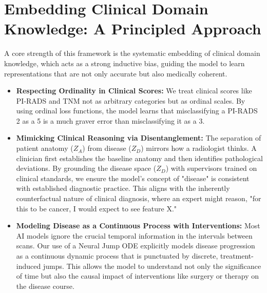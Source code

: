 \documentclass[11pt, a4paper]{article}
\begin{document}
\section{Embedding Clinical Domain Knowledge: A Principled Approach}
A core strength of this framework is the systematic embedding of clinical domain knowledge, which acts as a strong inductive bias, guiding the model to learn representations that are not only accurate but also medically coherent.
\begin{itemize}
    \item \textbf{Respecting Ordinality in Clinical Scores:} We treat clinical scores like PI-RADS and TNM not as arbitrary categories but as ordinal scales. By using ordinal loss functions, the model learns that misclassifying a PI-RADS 2 as a 5 is a much graver error than misclassifying it as a 3.
    \item \textbf{Mimicking Clinical Reasoning via Disentanglement:} The separation of patient anatomy ($Z_A$) from disease ($Z_D$) mirrors how a radiologist thinks. A clinician first establishes the baseline anatomy and then identifies pathological deviations. By grounding the disease space ($Z_D$) with supervisors trained on clinical standards, we ensure the model's concept of "disease" is consistent with established diagnostic practice. This aligns with the inherently counterfactual nature of clinical diagnosis, where an expert might reason, "for this to be cancer, I would expect to see feature X."
    \item \textbf{Modeling Disease as a Continuous Process with Interventions:} Most AI models ignore the crucial temporal information in the intervals between scans. Our use of a Neural Jump ODE explicitly models disease progression as a continuous dynamic process that is punctuated by discrete, treatment-induced jumps. This allows the model to understand not only the significance of time but also the causal impact of interventions like surgery or therapy on the disease course.
\end{itemize}
\end{document}
